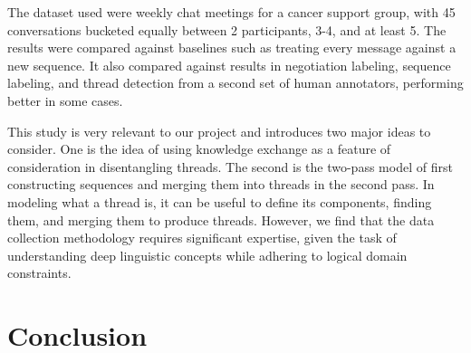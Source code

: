 \documentclass{article}
\begin{document}
The dataset used were weekly chat meetings for a cancer support group, with 45
conversations bucketed equally between 2 participants, 3-4, and at least 5. The
results were compared against baselines such as treating every message against
a new sequence. It also compared against results in negotiation labeling,
sequence labeling, and thread detection from a second set of human annotators,
performing better in some cases.

This study is very relevant to our project and introduces two major ideas to
consider. One is the idea of using knowledge exchange as a feature of
consideration in disentangling threads. The second is the two-pass model of
first constructing sequences and merging them into threads in the second pass.
In modeling what a thread is, it can be useful to define its components,
finding them, and merging them to produce threads. However, we find that the
data collection methodology requires significant expertise, given the task of
understanding deep linguistic concepts while adhering to logical domain
constraints.

\section{Conclusion}

{} 
\end{document}
